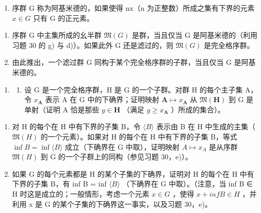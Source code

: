 \begin{enumerate}
\def\labelenumi{\arabic{enumi})}
\setcounter{enumi}{30}
\tightlist
\item
  序群 G 称为阿基米德的，如果使得 nx（n 为正整数）所成之集有下界的元素 \(x \in G\) 只有 G 的正元素。
\end{enumerate}

\begin{enumerate}
\def\labelenumi{\alph{enumi})}
\item
  序群 G 中主集所成的幺半群 \(\mathfrak{M}(G)\) 是群，当且仅当 G 是阿基米德的（利用习题 30 的 g) 与 d)）。如果此外 G 还是滤过的，则 \(\mathfrak{M}(G)\) 是完全格序群。
\item
  由此推出，一个滤过群 G 同构于某个完全格序群的子群，当且仅当 G 是阿基米德的。
\end{enumerate}

\begin{enumerate}
\def\labelenumi{\arabic{enumi})}
\setcounter{enumi}{31}
\tightlist
\item
  \begin{enumerate}
  \def\labelenumii{\alph{enumii})}
  \tightlist
  \item
    设 G 是一个完全格序群，H 是 G 的一个子群。对群 H 的每个主子集 A，令 \(x_{\mathbf{A}}\) 表示 A 在 G 中的下确界；证明映射 \(\mathbf{A} \mapsto x_{\mathbf{A}}\) 从 \(\mathfrak{M}(\mathbf{H})\) 到 G 是单射（证明 A 恰是那些 \(y \in \mathbf{H}\) （满足 \(y \geqslant x_{\mathbf{A}}\) ）所成的集合）。
  \end{enumerate}
\end{enumerate}

\begin{enumerate}
\def\labelenumi{\alph{enumi})}
\setcounter{enumi}{1}
\item
  对 H 的每个在 H 中有下界的子集 B，令 \(\langle B\rangle\) 表示由 B 在 H 中生成的主集（\(\mathfrak{M}(H)\) 的一个元素）。如果对 H 的每个在 H 中有下界的子集 B，等式 \(\inf B = \inf \langle B \rangle\) 成立（下确界在 G 中取），证明映射 \(A \mapsto x_{A}\) 是从序群 \(\mathfrak{M}(H)\) 到 G 的一个子群上的同构（参见习题 30，e)）。
\item
  如果 G 的每个元素都是 H 的某个子集的下确界，证明对 H 的每个在 H 中有下界的子集 B，有 inf B = inf \(\langle B\rangle\) （下确界在 G 中取）。（注意，当 inf B ∈ H 时这是成立的；一般情形，考虑一个元素 \(x \in G\) ，使得 \(x + inf B \in H\) ，并利用 x 是 G 的某个子集的下确界这一事实，以及习题 30，e)。
\end{enumerate}

